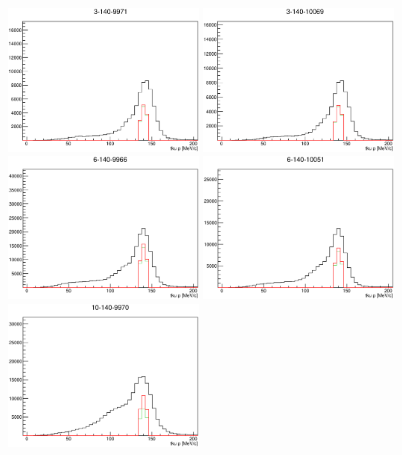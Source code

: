\begin{figure}[!tbh]
    \centering
    \includegraphics*[width=0.45\textwidth]{analysis_plots/plots_3-140-full/tku_p.eps}
    \includegraphics*[width=0.45\textwidth]{analysis_plots/plots_3-140-empty/tku_p.eps}
    \includegraphics*[width=0.45\textwidth]{analysis_plots/plots_6-140-full/tku_p.eps}
    \includegraphics*[width=0.45\textwidth]{analysis_plots/plots_6-140-empty/tku_p.eps}
    \includegraphics*[width=0.45\textwidth]{analysis_plots/plots_10-140-full/tku_p.eps}

\end{figure}
